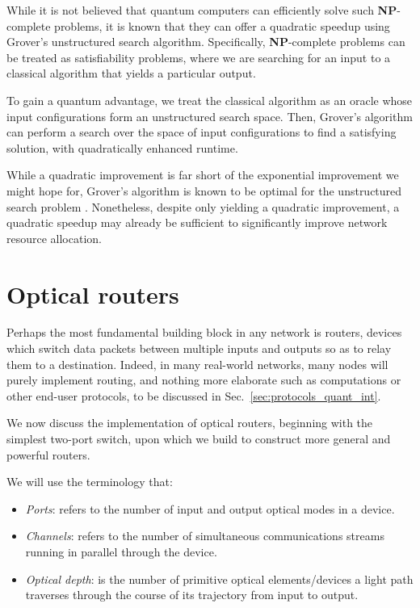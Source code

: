 \documentclass[aps, rmp, twocolumn, amsmath, amssymb, nofootinbib, superscriptaddress, longbibliography, floatfix, table-of-contents, eqsecnum]{revtex4-1}
\begin{document}
While it is not believed that quantum computers can efficiently solve such \textbf{NP}-complete problems, it is known that they can offer a quadratic speedup using Grover's unstructured search algorithm. Specifically, \textbf{NP}-complete problems can be treated as satisfiability problems, where we are searching for an input to a classical algorithm that yields a particular output.

To gain a quantum advantage, we treat the classical algorithm as an oracle whose input configurations form an unstructured search space. Then, Grover's algorithm can perform a search over the space of input configurations to find a satisfying solution, with quadratically enhanced runtime.

While a quadratic improvement is far short of the exponential improvement we might hope for, Grover's algorithm is known to be optimal for the unstructured search problem \cite{?}. Nonetheless, despite only yielding a quadratic improvement, a quadratic speedup may already be sufficient to significantly improve network resource allocation.

%
%

\section{Optical routers} 

Perhaps the most fundamental building block in any network is routers, devices which switch data packets between multiple inputs and outputs so as to relay them to a destination. Indeed, in many real-world networks, many nodes will purely implement routing, and nothing more elaborate such as computations or other end-user protocols, to be discussed in Sec.~\ref{sec:protocols_quant_int}.

We now discuss the implementation of optical routers, beginning with the simplest two-port switch, upon which we build to construct more general and powerful routers.

We will use the terminology that:
\begin{itemize}
	\item \textit{Ports}: refers to the number of input and output optical modes in a device.
	\item \textit{Channels}: refers to the number of simultaneous communications streams running in parallel through the device.
	\item \textit{Optical depth}: is the number of primitive optical elements/devices a light path traverses through the course of its trajectory from input to output.
\end{itemize}
\end{document}
